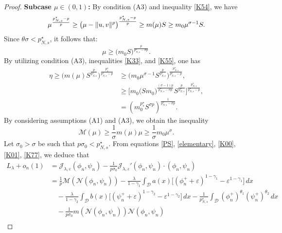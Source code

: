 \documentclass[reqno]{amsart}
\begin{document}
\begin{proof}
\noindent\textbf{Subcase $\mu\in (0,1)$:} By condition (A3) and inequality
\eqref{K54}, we have
\[
\mu^\frac{p^\star_{N,s}-p}{p} \geq \big(\mu-\| u,v\|^p\big)^\frac{p^\star_{N,s}-p}{p}\\
\geq  m(\mu) S
\geq  m_0 \mu^{\sigma-1}S.
\]
Since $\theta \sigma<p_{N,s}^\star$, it follows that:
\begin{equation}\label{K55}
\mu\geq \big(m_0 S\big)^\frac{p}{p_{N,s}^\star-\sigma p}.
\end{equation}
By utilizing condition (A3), inequalities \eqref{K33}, and \eqref{K55}, one has
\begin{equation} \label{K66}
\begin{aligned}
\eta\geq \Big( m(\mu)S^\frac{p}{p^\star_{N,s}}
\Big)^{\frac{p^\star_s}{p^\star_{N,s}-p}}
&\geq \Big(m_0\mu^{\sigma-1}S^\frac{p}{p^\star_{N,s}} \Big)^{\frac{p^\star_{N,s}}{p^\star_{N,s}-p}}, \\
&\geq \Big[m_0\big(S m_0\big)^\frac{(\sigma-1)p}{p^\star_{N,s}-\sigma p}S^\frac{p}{p^\star_{N,s}} \Big]^{\frac{p^\star_{N,s}}{p^\star_{N,s}-p}},\\
&= (m_0^{p^\star_s}S^{\sigma p})^\frac{1}{p^\star_{N,s}-\sigma p}.
\end{aligned}
\end{equation}
By considering assumptions (A1) and (A3), we obtain the  inequality
\begin{equation}\label{K77}
\mathscr{M}(\mu)\geq \frac{1}{\sigma}m(\mu)\mu\geq \frac{1}{\sigma}m_0\mu^\sigma.
\end{equation}
Let $\sigma_0>\sigma$ be such that $p\sigma_0<p^\star_{N,s}$.
From equations \eqref{PS}, \eqref{elementary}, \eqref{K00}, \eqref{K01}, \eqref{K77},
we deduce that
\begin{equation} \label{eq01}
\begin{aligned}
L_\lambda+o_n(1)
&=\mathcal{J}_{\lambda,\varepsilon}(\phi_n,\psi_n)-\frac{1}{p\sigma_0}\mathcal{J}_{\lambda,\varepsilon}'(\phi_n,\psi_n)\cdot(\phi_n,\psi_n) \\
&=\frac{1}{p}\mathscr{M}(\mathcal{N}(\phi_n,\psi_n))-\frac{\lambda}{1-\gamma_1}\int_\mathcal{D} a(x)\Big[(\phi_n^++\varepsilon)^{1-\gamma_1}-\varepsilon^{1-\gamma_1}\Big]\,dx\\
&\quad-\frac{\lambda}{1-\gamma_2}\int_\mathcal{D} b(x)\Big[(\psi_n^++\varepsilon)^{1-\gamma_2}-\varepsilon^{1-\gamma_2}\Big]\,dx-\frac{1}{p^\star_{N,s}}\int_\mathcal{D}  (\phi_n^+)^{\theta_1}(\psi_n^+)^{\theta_2}\,dx \\
&\quad-\frac{1}{p\sigma_0}m(\mathcal{N}(\phi_n,\psi_n))\mathcal{N}(\phi_n,\psi_n) \\

\end{aligned}
\end{equation}
\end{proof}
\end{document}
